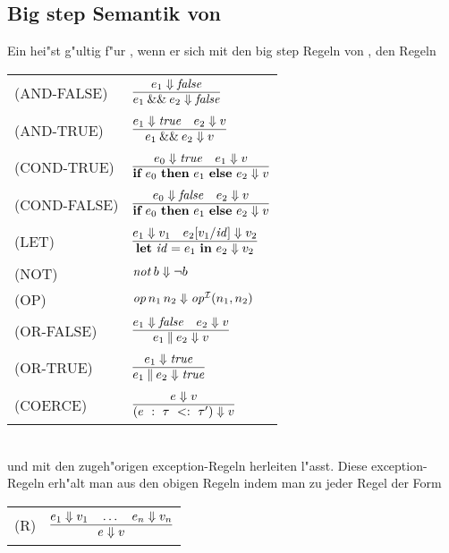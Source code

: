 \subsection{Big step Semantik von \LONE}

Ein  hei"st g"ultig f"ur \LONE, wenn er sich mit den big step Regeln von \LZERO, den Regeln\\[5mm]
  \begin{tabular}{ll}
     \mbox{(AND-FALSE)}   & $\regel{e_1 \eval \false}
                                   {\andalso{e_1}{e_2} \eval \false}$ \\[5mm]
     \mbox{(AND-TRUE)}    & $\regel{e_1 \eval \true \quad e_2 \eval v}
                                   {\andalso{e_1}{e_2} \eval v}$ \\[5mm]
     \mbox{(COND-TRUE)}   & $\regel{e_0 \eval \true \quad e_1 \eval v}
                                   {\bifte{e_0}{e_1}{e_2} \eval v}$ \\[5mm]
     \mbox{(COND-FALSE)}  & $\regel{e_0 \eval \false \quad e_2 \eval v}
                                   {\bifte{e_0}{e_1}{e_2} \eval v}$ \\[5mm]
     \mbox{(LET)}         & $\regel{e_1 \eval v_1 \quad e_2[v_1/\id] \eval v_2}
                                   {\bli{\id}{e_1}{e_2} \eval v_2}$ \\[5mm]
     \mbox{(NOT)}         & ${\text{\it not\/}}\,b \Downarrow \neg b$ \\[3mm]
     \mbox{(OP)}          & ${\text{\it op\/}}\,n_1\,n_2 \Downarrow {\text{\it op\/}}^{{\cal I}}(n_1,n_2)$ \\[3mm]
     \mbox{(OR-FALSE)}    & $\regel{e_1 \eval \false\quad e_2 \eval v}
                                   {\orelse{e_1}{e_2} \eval v}$ \\[5mm]
     \mbox{(OR-TRUE)}     & $\regel{e_1 \eval \true}
                                   {\orelse{e_1}{e_2} \eval \true}$\\[5mm]
     \mbox{(COERCE)}      & $\regel{e \eval v}
                                   {\coercion{e}{\tau}{\tau'} \eval v}$
  \end{tabular}\\[7mm]
und mit den zugeh"origen exception-Regeln herleiten l"asst. Diese exception-Regeln erh"alt man
aus den obigen Regeln indem man zu jeder Regel der Form\\[2mm]
   \begin{tabular}{ll}
     \mbox{(R)} & $\regel{e_1 \eval v_1 \quad \ldots \quad  e_n \eval v_n}
                         {e \eval v}$

   \end{tabular}\\[3mm]
